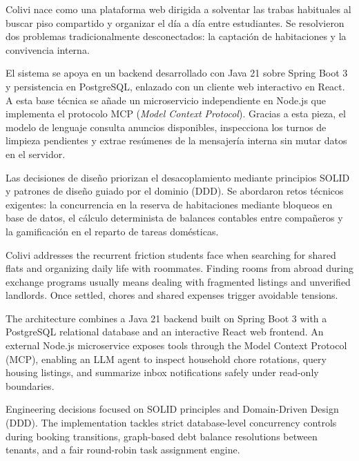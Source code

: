     Colivi nace como una plataforma web dirigida a solventar las trabas habituales al buscar piso compartido y organizar el día a día entre estudiantes. Se resolvieron dos problemas tradicionalmente desconectados: la captación de habitaciones y la convivencia interna.

    El sistema se apoya en un backend desarrollado con Java 21 sobre Spring Boot 3 y persistencia en PostgreSQL, enlazado con un cliente web interactivo en React. A esta base técnica se añade un microservicio independiente en Node.js que implementa el protocolo MCP (\emph{Model Context Protocol}). Gracias a esta pieza, el modelo de lenguaje consulta anuncios disponibles, inspecciona los turnos de limpieza pendientes y extrae resúmenes de la mensajería interna sin mutar datos en el servidor.

    Las decisiones de diseño priorizan el desacoplamiento mediante principios SOLID y patrones de diseño guiado por el dominio (DDD). Se abordaron retos técnicos exigentes: la concurrencia en la reserva de habitaciones mediante bloqueos en base de datos, el cálculo determinista de balances contables entre compañeros y la gamificación en el reparto de tareas domésticas.

\vspace{1.5cm}
    Colivi addresses the recurrent friction students face when searching for shared flats and organizing daily life with roommates. Finding rooms from abroad during exchange programs usually means dealing with fragmented listings and unverified landlords. Once settled, chores and shared expenses trigger avoidable tensions.

    The architecture combines a Java 21 backend built on Spring Boot 3 with a PostgreSQL relational database and an interactive React web frontend. An external Node.js microservice exposes tools through the Model Context Protocol (MCP), enabling an LLM agent to inspect household chore rotations, query housing listings, and summarize inbox notifications safely under read-only boundaries.

    Engineering decisions focused on SOLID principles and Domain-Driven Design (DDD). The implementation tackles strict database-level concurrency controls during booking transitions, graph-based debt balance resolutions between tenants, and a fair round-robin task assignment engine.
